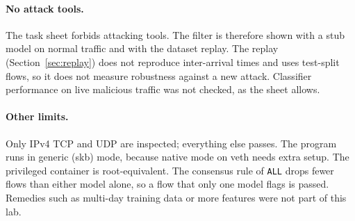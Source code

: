 \paragraph{No attack tools.} The task sheet forbids attacking tools. The filter is therefore shown with a stub model on normal traffic and with the dataset replay. The replay (Section~\ref{sec:replay}) does not reproduce inter-arrival times and uses test-split flows, so it does not measure robustness against a new attack. Classifier performance on live malicious traffic was not checked, as the sheet allows.

\paragraph{Other limits.} Only IPv4 TCP and UDP are inspected; everything else passes. The program runs in generic (skb) mode, because native mode on veth needs extra setup. The privileged container is root-equivalent. The consensus rule of \texttt{ALL} drops fewer flows than either model alone, so a flow that only one model flags is passed. Remedies such as multi-day training data or more features were not part of this lab.
